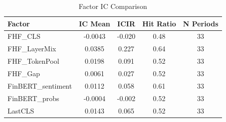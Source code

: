 \begin{table}[H]
\centering
\caption{Factor IC Comparison}
\label{tab:ic-comparison}
\begin{tabular}{lcccc}
\toprule
\textbf{Factor} & \textbf{IC Mean} & \textbf{ICIR} & \textbf{Hit Ratio} & \textbf{N Periods} \\
\midrule
    FHF_CLS & -0.0043 & -0.020 & 0.48 & 33 \\
    FHF_LayerMix & 0.0385 & 0.227 & 0.64 & 33 \\
    FHF_TokenPool & 0.0198 & 0.091 & 0.52 & 33 \\
    FHF_Gap & 0.0061 & 0.027 & 0.52 & 33 \\
    FinBERT_sentiment & 0.0112 & 0.058 & 0.61 & 33 \\
    FinBERT_probs & -0.0004 & -0.002 & 0.52 & 33 \\
    LastCLS & 0.0143 & 0.065 & 0.52 & 33 \\
\bottomrule
\end{tabular}
\end{table}
